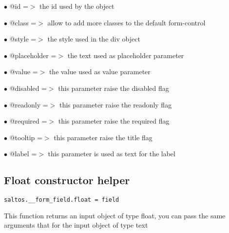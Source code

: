 \documentclass[a4paper]{book}
\begin{document}
\begin{compactitem}
\item[\color{myblue}$\bullet$] @id          =$>$ the id used by the object
\item[\color{myblue}$\bullet$] @class       =$>$ allow to add more classes to the default form-control
\item[\color{myblue}$\bullet$] @style       =$>$ the style used in the div object
\item[\color{myblue}$\bullet$] @placeholder =$>$ the text used as placeholder parameter
\item[\color{myblue}$\bullet$] @value       =$>$ the value used as value parameter
\item[\color{myblue}$\bullet$] @disabled    =$>$ this parameter raise the disabled flag
\item[\color{myblue}$\bullet$] @readonly    =$>$ this parameter raise the readonly flag
\item[\color{myblue}$\bullet$] @required    =$>$ this parameter raise the required flag
\item[\color{myblue}$\bullet$] @tooltip     =$>$ this parameter raise the title flag
\item[\color{myblue}$\bullet$] @label       =$>$ this parameter is used as text for the label
\end{compactitem}

\hypertarget{toc377}{}
\subsection{Float constructor helper}

\begin{lstlisting}
saltos.__form_field.float = field
\end{lstlisting}

This function returns an input object of type float, you can pass the same arguments
that for the input object of type text
\end{document}
